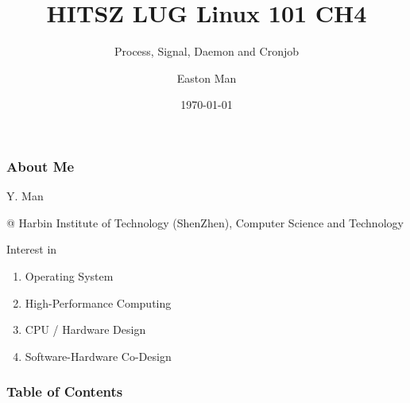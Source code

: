 \documentclass[aspectratio=169]{beamer}
\title{HITSZ LUG Linux 101 CH4}
\subtitle{Process, Signal, Daemon and Cronjob}
\author{Easton Man}
\institute[HITSZ LUG]{HITSZ Linux User Group}
\date{\today}
\begin{document}
\frame{\titlepage}

\begin{frame}
    \frametitle{About Me}

    Y. Man

    @ Harbin Institute of Technology (ShenZhen), Computer Science and Technology

    \vspace{2em}

    Interest in
    \begin{enumerate}
        \item Operating System
        \item High-Performance Computing
        \item CPU / Hardware Design
        \item Software-Hardware Co-Design
    \end{enumerate}

\end{frame}

\begin{frame}
    \frametitle{Table of Contents}
    \tableofcontents
\end{frame}







\end{document}
